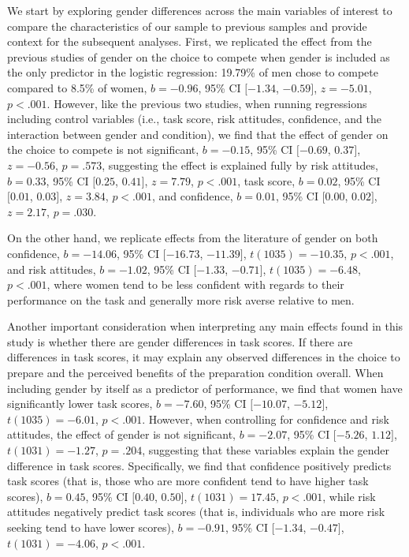 \documentclass[a4paper,nobind]{templates/ociamthesis}
\begin{document}
We start by exploring gender differences across the main variables of interest to compare the characteristics of our sample to previous samples and provide context for the subsequent analyses. First, we replicated the effect from the previous studies of gender on the choice to compete when gender is included as the only predictor in the logistic regression: 19.79\% of men chose to compete compared to 8.5\% of women, \(b = -0.96\), 95\% CI \([-1.34\), \(-0.59]\), \(z = -5.01\), \(p < .001\). However, like the previous two studies, when running regressions including control variables (i.e., task score, risk attitudes, confidence, and the interaction between gender and condition), we find that the effect of gender on the choice to compete is not significant, \(b = -0.15\), 95\% CI \([-0.69\), \(0.37]\), \(z = -0.56\), \(p = .573\), suggesting the effect is explained fully by risk attitudes, \(b = 0.33\), 95\% CI \([0.25\), \(0.41]\), \(z = 7.79\), \(p < .001\), task score, \(b = 0.02\), 95\% CI \([0.01\), \(0.03]\), \(z = 3.84\), \(p < .001\), and confidence, \(b = 0.01\), 95\% CI \([0.00\), \(0.02]\), \(z = 2.17\), \(p = .030\).

On the other hand, we replicate effects from the literature of gender on both confidence, \(b = -14.06\), 95\% CI \([-16.73\), \(-11.39]\), \(t(1035) = -10.35\), \(p < .001\), and risk attitudes, \(b = -1.02\), 95\% CI \([-1.33\), \(-0.71]\), \(t(1035) = -6.48\), \(p < .001\), where women tend to be less confident with regards to their performance on the task and generally more risk averse relative to men.

Another important consideration when interpreting any main effects found in this study is whether there are gender differences in task scores. If there are differences in task scores, it may explain any observed differences in the choice to prepare and the perceived benefits of the preparation condition overall. When including gender by itself as a predictor of performance, we find that women have significantly lower task scores, \(b = -7.60\), 95\% CI \([-10.07\), \(-5.12]\), \(t(1035) = -6.01\), \(p < .001\). However, when controlling for confidence and risk attitudes, the effect of gender is not significant, \(b = -2.07\), 95\% CI \([-5.26\), \(1.12]\), \(t(1031) = -1.27\), \(p = .204\), suggesting that these variables explain the gender difference in task scores. Specifically, we find that confidence positively predicts task scores (that is, those who are more confident tend to have higher task scores), \(b = 0.45\), 95\% CI \([0.40\), \(0.50]\), \(t(1031) = 17.45\), \(p < .001\), while risk attitudes negatively predict task scores (that is, individuals who are more risk seeking tend to have lower scores), \(b = -0.91\), 95\% CI \([-1.34\), \(-0.47]\), \(t(1031) = -4.06\), \(p < .001\).
\end{document}
